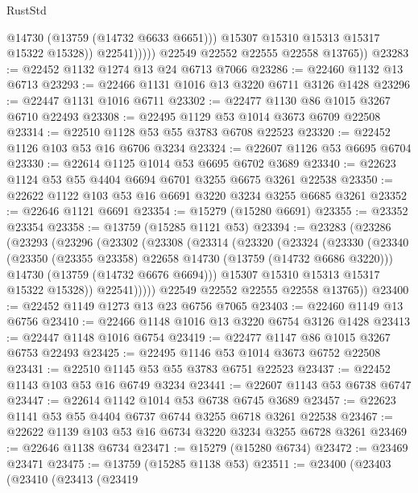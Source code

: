 \begin{lexlean}{RustStd}
\begin{coremodule}
                        @14730
                        (@13759 (@14732 @6633 @6651)))
                      @15307
                      @15310
                      @15313
                      @15317
                      @15322
                      @15328))
                  @22541)))))
        @22549
        @22552
        @22555
        @22558
        @13765))
@23283 := @22452 @1132 @1274 @13 @24 @6713 @7066
@23286 := @22460 @1132 @13 @6713
@23293 := @22466 @1131 @1016 @13 @3220 @6711 @3126 @1428
@23296 := @22447 @1131 @1016 @6711
@23302 := @22477 @1130 @86 @1015 @3267 @6710 @22493
@23308 := @22495 @1129 @53 @1014 @3673 @6709 @22508
@23314 := @22510 @1128 @53 @55 @3783 @6708 @22523
@23320 := @22452 @1126 @103 @53 @16 @6706 @3234
@23324 := @22607 @1126 @53 @6695 @6704
@23330 := @22614 @1125 @1014 @53 @6695 @6702 @3689
@23340 := @22623 @1124 @53 @55 @4404 @6694 @6701 @3255 @6675 @3261 @22538
@23350 := @22622 @1122 @103 @53 @16 @6691 @3220 @3234 @3255 @6685 @3261
@23352 := @22646 @1121 @6691
@23354 := @15279 (@15280 @6691)
@23355 := @23352 @23354
@23358 := @13759 (@15285 @1121 @53)
@23394 := @23283
    (@23286
      (@23293
        (@23296
          (@23302
            (@23308
              (@23314
                (@23320
                  (@23324
                    (@23330
                      (@23340
                        (@23350 (@23355 @23358) @22658 @14730 (@13759 (@14732 @6686 @3220)))
                        @14730
                        (@13759 (@14732 @6676 @6694)))
                      @15307
                      @15310
                      @15313
                      @15317
                      @15322
                      @15328))
                  @22541)))))
        @22549
        @22552
        @22555
        @22558
        @13765))
@23400 := @22452 @1149 @1273 @13 @23 @6756 @7065
@23403 := @22460 @1149 @13 @6756
@23410 := @22466 @1148 @1016 @13 @3220 @6754 @3126 @1428
@23413 := @22447 @1148 @1016 @6754
@23419 := @22477 @1147 @86 @1015 @3267 @6753 @22493
@23425 := @22495 @1146 @53 @1014 @3673 @6752 @22508
@23431 := @22510 @1145 @53 @55 @3783 @6751 @22523
@23437 := @22452 @1143 @103 @53 @16 @6749 @3234
@23441 := @22607 @1143 @53 @6738 @6747
@23447 := @22614 @1142 @1014 @53 @6738 @6745 @3689
@23457 := @22623 @1141 @53 @55 @4404 @6737 @6744 @3255 @6718 @3261 @22538
@23467 := @22622 @1139 @103 @53 @16 @6734 @3220 @3234 @3255 @6728 @3261
@23469 := @22646 @1138 @6734
@23471 := @15279 (@15280 @6734)
@23472 := @23469 @23471
@23475 := @13759 (@15285 @1138 @53)
@23511 := @23400
    (@23403
      (@23410
        (@23413
          (@23419

\end{coremodule}
\end{lexlean}
